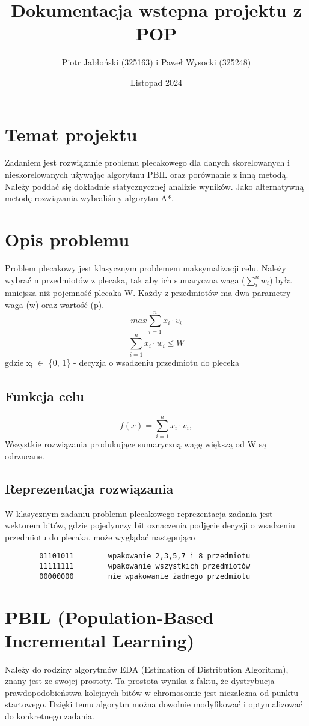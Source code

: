 \documentclass[11pt]{article}
\author{Piotr Jabłoński (325163) i Paweł Wysocki (325248)}
\date{Listopad 2024}
\title{Dokumentacja wstepna projektu z POP}
\begin{document}
\maketitle
\tableofcontents

\pagebreak
\section{Temat projektu}
\label{sec:org66d662c}
Zadaniem jest rozwiązanie problemu plecakowego dla danych skorelowanych i nieskorelowanych używając algorytmu PBIL oraz porównanie z inną metodą. Należy poddać się dokładnie statycznycznej analizie wyników. Jako alternatywną metodę rozwiązania wybraliśmy algorytm A*.
\section{Opis problemu}
\label{sec:org4d991fb}
Problem plecakowy jest klasycznym problemem maksymalizacji celu. Należy wybrać n przedmiotów z plecaka, tak aby ich sumaryczna waga (\(\sum_i^n{w_i}\)) była mniejsza niż pojemność plecaka W. Każdy z przedmiotów ma dwa parametry - waga (w) oraz wartość (p).
\[
        max \sum_{i=1}^n{x_i \cdot v_i}
\]
\[
        \sum_{i=1}^n{x_i \cdot w_i} \leq W
\]
gdzie x\textsubscript{i} \(\in\) \{0, 1\} - decyzja o wsadzeniu przedmiotu do pleceka
\subsection{Funkcja celu}
\label{sec:orgfed3d26}
\[
        f(x) = \sum_{i=1}^n{x_i \cdot v_i},
\]
Wszystkie rozwiązania produkujące sumaryczną wagę większą od W są odrzucane.
\subsection{Reprezentacja rozwiązania}
\label{sec:org7c490b7}
W klasycznym zadaniu problemu plecakowego reprezentacja zadania jest wektorem bitów, gdzie pojedynczy bit oznaczenia podjęcie decyzji o wsadzeniu przedmiotu do plecaka, może wyglądać następująco
\begin{verbatim}
        01101011        wpakowanie 2,3,5,7 i 8 przedmiotu
        11111111        wpakowanie wszystkich przedmiotów
        00000000        nie wpakowanie żadnego przedmiotu
\end{verbatim}

\pagebreak
\section{PBIL (Population-Based Incremental Learning)}
\label{sec:org5c31017}
Należy do rodziny algorytmów EDA (Estimation of Distribution Algorithm), znany jest ze swojej prostoty. Ta prostota wynika z faktu, że dystrybucja prawdopodobieństwa kolejnych bitów w chromosomie jest niezależna od punktu startowego. Dzięki temu algorytm można dowolnie modyfikować i optymalizować do konkretnego zadania.
\end{document}
